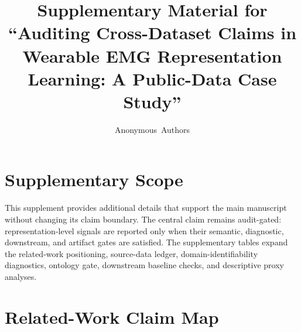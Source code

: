 \documentclass[journal]{IEEEtran}
\newcommand{\papertitle}{Auditing Cross-Dataset Claims in Wearable EMG Representation Learning: A Public-Data Case Study}
\begin{document}
\renewcommand{\thefigure}{S\arabic{figure}}

\title{Supplementary Material for ``\papertitle''}

\author{Anonymous~Authors}

\maketitle

\section{Supplementary Scope}
This supplement provides additional details that support the main manuscript without changing its claim boundary. The central claim remains audit-gated: representation-level signals are reported only when their semantic, diagnostic, downstream, and artifact gates are satisfied. The supplementary tables expand the related-work positioning, source-data ledger, domain-identifiability diagnostics, ontology gate, downstream baseline checks, and descriptive proxy analyses.

\section{Related-Work Claim Map}
\end{document}
